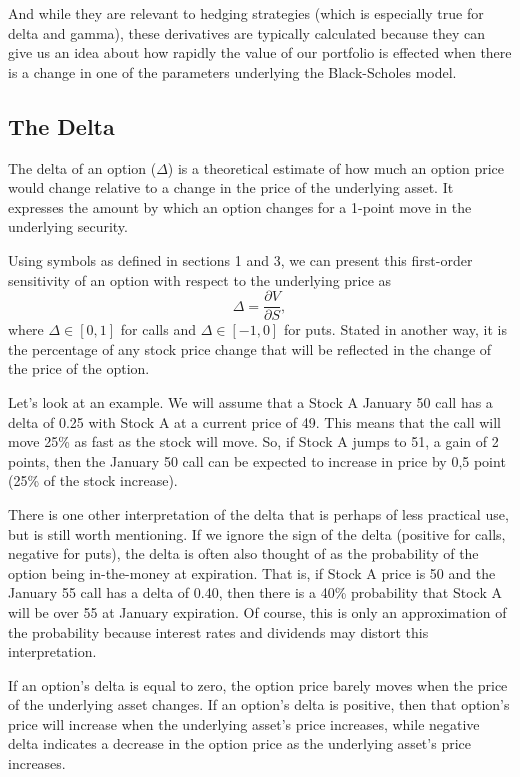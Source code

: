 \documentclass[a4paper, 12pt]{article}
\theoremstyle{definition}
\theoremstyle{plain}
\theoremstyle{definition}
\begin{document}
And while they are relevant to hedging strategies 
(which is especially true for delta and gamma),
these derivatives are typically calculated because 
they can give us an idea about how rapidly 
the value of our portfolio is effected when there is a 
change in one of the parameters underlying the 
Black-Scholes model.



\subsection{The Delta}

The delta of an option ($\Delta$) 
is a theoretical estimate 
of how much an option price would change 
relative to a change in the price of the underlying asset.
It expresses the amount by which an option changes for a 1-point 
move in the underlying security.

Using symbols as defined in sections 1 and 3, 
we can present this first-order sensitivity of an option
with respect to the underlying price 
as 
$$
\Delta = \frac{\partial V}{\partial S},
$$ 
where $\Delta\in [0,1]$ for calls and $\Delta\in [-1,0]$ for puts.
Stated in another way, it is the percentage of any
stock price change that will be reflected in the change of the 
price of the option. 

Let's look at an example. We will assume that a Stock A January 50 call has a delta of 0.25 
with Stock A at a current price of 49. This means that the call will move 
25\% as fast as the stock will move. So, if Stock A
jumps to 51, a gain of 2 points, then the January 50 call can be expected to increase
in price by 0,5 point (25\% of the stock increase).

There is one other interpretation of the delta that is perhaps of less practical
use, but is still worth mentioning.
If we ignore the sign of the delta (positive for
calls, negative for puts),
the delta is often also thought of as the probability of the
option being in-the-money at expiration. 
That is, if Stock A price is 50 and the January 55 call has
a delta of 0.40, then there is a 40\% probability that Stock A will be over 55 at January
expiration. 
Of course, this is only an approximation of the probability because
interest rates and dividends may distort this interpretation.

If an option's 
delta is equal to zero, the 
option price barely moves when the price of the 
underlying asset changes. 
If an option's delta is positive, then 
that option's price will increase 
when the underlying asset's price 
increases, while negative delta indicates a decrease
in the option price as the underlying 
asset's price increases. 
\end{document}
